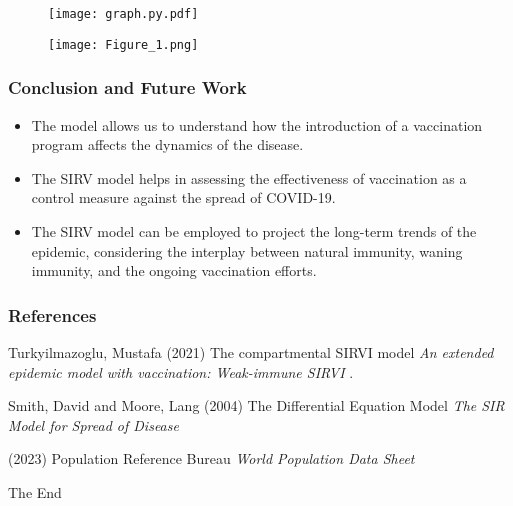 \documentclass{beamer}
\let\olditem\item
\renewcommand{\item}{\setlength{\itemsep}{\fill}\olditem}
\begin{document}
\begin{frame}
\begin{figure}
\begin{center}
\texttt{[image: graph.py.pdf]}
\end{center}
\end{figure}
\end{frame}


\begin{frame}  
\begin{figure}
\begin{center}
\texttt{[image: Figure\_1.png]}
\end{center}
\end{figure}
\end{frame}


\begin{frame}
\frametitle{Conclusion and Future Work}
\begin{itemize}
\item  The model allows us to understand how the introduction of a vaccination program affects the dynamics of the disease.
\item The SIRV model helps in assessing the effectiveness of vaccination as a control measure against the spread of COVID-19. 
\item The SIRV model can be employed to project the long-term trends of the epidemic, considering the interplay between natural immunity, waning immunity, and the ongoing vaccination efforts.
\end{itemize}
\end{frame}

\begin{frame}
\frametitle{References}
\footnotesize{
\begin{thebibliography}{99}

 Turkyilmazoglu, Mustafa (2021)
\newblock  The compartmental SIRVI model
\newblock \emph{An extended epidemic model with vaccination:
Weak-immune SIRVI
}.

  Smith, David and Moore, Lang (2004)
\newblock The Differential Equation Model
\newblock \emph{The SIR Model for Spread of Disease}

  (2023)
\newblock Population Reference Bureau
\newblock \emph{World Population Data Sheet } 

\end{thebibliography}
}
\end{frame}

\begin{frame}
\Huge{\centerline{The End}}
\end{frame}
\end{document}

